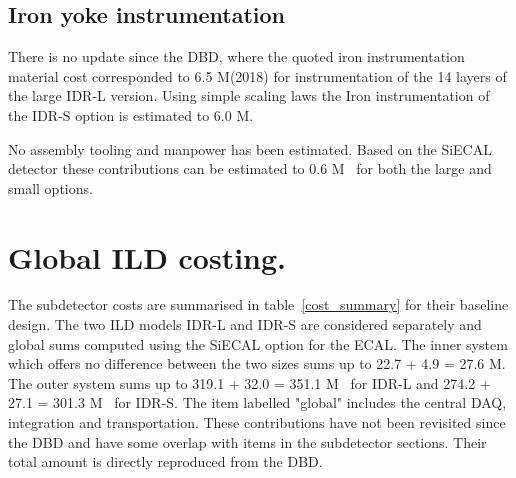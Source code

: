\subsection{Iron yoke instrumentation}
There is no update since the DBD, where the quoted iron instrumentation material cost corresponded to 6.5 M\texteuro(2018) for instrumentation of the 14 layers of the large IDR-L version. Using simple scaling laws the Iron instrumentation of the IDR-S option is estimated to 6.0 M\texteuro.


No assembly tooling and manpower has been estimated. Based on the SiECAL detector these contributions can be estimated to 0.6 M\texteuro~ for both the large and small options. 

\section{Global ILD costing.}
The subdetector costs are summarised in table~\ref{cost_summary} for their baseline design. The two ILD models IDR-L and IDR-S are considered separately and global sums computed using the SiECAL option for the ECAL.
The inner system which offers no difference between the two sizes sums up to 22.7 + 4.9 = 27.6 M\texteuro. The outer system sums up to 319.1 + 32.0 = 351.1 M\texteuro~ for IDR-L and 274.2 + 27.1 = 301.3 M\texteuro~ for IDR-S.
The item labelled "global" includes the central DAQ, integration and transportation. These contributions have not been revisited since the DBD and have some overlap with items in the subdetector sections. Their total amount is directly reproduced from the DBD.

